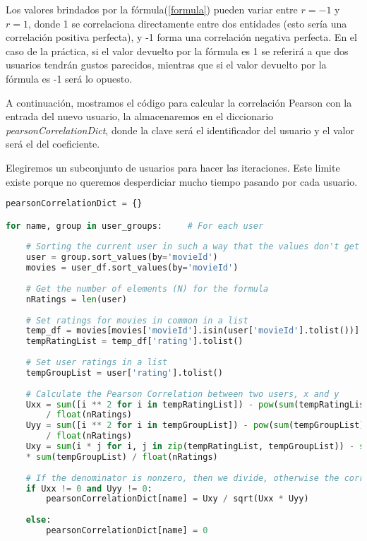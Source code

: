\documentclass{uimppracticas}
\begin{document}
Los valores brindados por la fórmula(\ref{formula}) pueden variar entre $r=-1$ y $r=1$, donde 1 se correlaciona directamente entre dos entidades (esto sería una correlación positiva perfecta), y -1 forma una correlación negativa perfecta. En el caso de la práctica, si el valor devuelto por la fórmula es 1 se referirá a que dos usuarios tendrán gustos parecidos, mientras que si el valor devuelto por la fórmula es -1 será lo opuesto.

A continuación, mostramos el código para calcular la correlación Pearson con la entrada del nuevo usuario, la almacenaremos en el diccionario \textit{pearsonCorrelationDict}, donde la clave será el identificador del usuario y el valor será el del coeficiente.

Elegiremos un subconjunto de usuarios para hacer las iteraciones. Este limite existe porque no queremos desperdiciar mucho tiempo pasando por cada usuario.

\begin{lstlisting}[language=python]
pearsonCorrelationDict = {}

for name, group in user_groups:     # For each user
	
	# Sorting the current user in such a way that the values don't get mixed up later
	user = group.sort_values(by='movieId')
	movies = user_df.sort_values(by='movieId')
	
	# Get the number of elements (N) for the formula
	nRatings = len(user)
	
	# Set ratings for movies in common in a list
	temp_df = movies[movies['movieId'].isin(user['movieId'].tolist())]
	tempRatingList = temp_df['rating'].tolist()
	
	# Set user ratings in a list
	tempGroupList = user['rating'].tolist()
	
	# Calculate the Pearson Correlation between two users, x and y
	Uxx = sum([i ** 2 for i in tempRatingList]) - pow(sum(tempRatingList), 2) 
		/ float(nRatings)
	Uyy = sum([i ** 2 for i in tempGroupList]) - pow(sum(tempGroupList), 2) 
		/ float(nRatings)
	Uxy = sum(i * j for i, j in zip(tempRatingList, tempGroupList)) - sum(tempRatingList)  
	* sum(tempGroupList) / float(nRatings)
	
	# If the denominator is nonzero, then we divide, otherwise the correlation is 0
	if Uxx != 0 and Uyy != 0:
		pearsonCorrelationDict[name] = Uxy / sqrt(Uxx * Uyy)
	
	else:
		pearsonCorrelationDict[name] = 0
\end{lstlisting}
\end{document}
